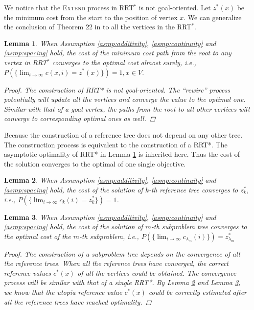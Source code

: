 \documentclass[conference]{IEEEtran}
\newtheorem{lem}{Lemma}
\begin{document}
We notice that the \textsc{Extend} process in RRT$^{*}$ is not goal-oriented.
Let $ z^{*}(x) $ be the minimum cost from the start to the position of vertex $ x $.
We can generalize the conclusion of Theorem 22 in \cite{Karaman.Frazzoli:RSS10} to all the vertices in the RRT$^{*}$.
\begin{lem}
\label{lem:tree_vex:conv}
When Assumption \ref{asmp:additivity}, \ref{asmp:continuity} and \ref{asmp:spacing} hold,
the cost of the minimum cost path from the root to any vertex in RRT$^{*}$ converges to the optimal cost almost surely, i.e.,
$
P( \{ \lim_{ i \rightarrow \infty } c(x, i)  = z^{*}(x) \} ) = 1, x \in V $.
\begin{proof}
	The construction of RRT* is not goal-oriented.
	The ``rewire'' process potentially will update all the vertices and converge the value to the optimal one.
	Similar with that of a goal vertex, the paths from the root to all other vertices will converge to corresponding optimal ones as well.
\end{proof}
\end{lem}

Because the construction of a reference tree does not depend on any other tree.
The construction process is equivalent to the construction of a RRT*.
The asymptotic optimality of RRT* in Lemma \ref{lem:tree_vex:conv} is inherited here.
Thus the cost of the solution converges to the optimal of one single objective.
\begin{lem}
\label{lem:ref_tree:conv}
When Assumption \ref{asmp:additivity}, \ref{asmp:continuity} and \ref{asmp:spacing} hold,
the cost of the solution of $ k $-th reference tree converges to $ z^{*}_{k} $, i.e., 
$ P( \{ \lim_{ i \rightarrow \infty }  c_{k} ( i ) = z^{*}_{k}  \} ) = 1  $.
\end{lem}


\begin{lem}
\label{lem:sub_tree:conv}
When Assumption \ref{asmp:additivity}, \ref{asmp:continuity} and \ref{asmp:spacing} hold,
the cost of the solution of $ m $-th subproblem tree converges to the optimal cost of the $ m $-th subproblem, i.e.,
$
P( \{ \lim_{ i \rightarrow \infty } c_{ \lambda_{m} }( i ) \} ) = z^{*}_{ \lambda_{m} }
$
\begin{proof}
The construction of a subproblem tree depends on the convergence of all the reference trees.
When all the reference trees have converged, the correct reference values $ c^{*} (x) $ of all the vertices could be obtained.
The convergence process will be similar with that of a single RRT*.
By Lemma \ref{lem:ref_tree:conv} and Lemma \ref{lem:sub_tree:conv}, we know that the utopia reference value $ c^{*} (x) $ could be correctly estimated after all the reference trees have reached optimality.
\end{proof}
\end{lem}
\end{document}
